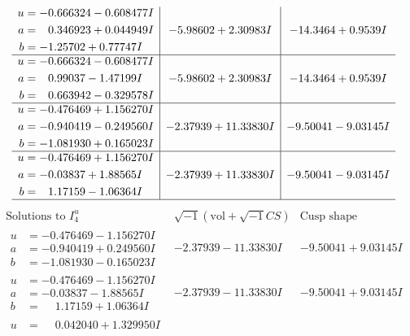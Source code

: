 \documentclass[1p]{elsarticle_modified}
\theoremstyle{definition}
\newcommand{\I}{\sqrt{-1}}
\begin{document}
$$\begin{array}{c|c|c}
\begin{aligned}
u &= -0.666324 - 0.608477 I \\
a &= \phantom{-}0.346923 + 0.044949 I \\
b &= -1.25702 + 0.77747 I\end{aligned}
 & -5.98602 + 2.30983 I & -14.3464 + 0.9539 I \\ \hline\begin{aligned}
u &= -0.666324 - 0.608477 I \\
a &= \phantom{-}0.99037 - 1.47199 I \\
b &= \phantom{-}0.663942 - 0.329578 I\end{aligned}
 & -5.98602 + 2.30983 I & -14.3464 + 0.9539 I \\ \hline\begin{aligned}
u &= -0.476469 + 1.156270 I \\
a &= -0.940419 - 0.249560 I \\
b &= -1.081930 + 0.165023 I\end{aligned}
 & -2.37939 + 11.33830 I & -9.50041 - 9.03145 I \\ \hline\begin{aligned}
u &= -0.476469 + 1.156270 I \\
a &= -0.03837 + 1.88565 I \\
b &= \phantom{-}1.17159 - 1.06364 I\end{aligned}
 & -2.37939 + 11.33830 I & -9.50041 - 9.03145 I\\
 \hline 
 \end{array}$$\newpage$$\begin{array}{c|c|c}  
\text{Solutions to }I^u_{4}& \I (\text{vol} + \sqrt{-1}CS) & \text{Cusp shape}\\
 \hline 
\begin{aligned}
u &= -0.476469 - 1.156270 I \\
a &= -0.940419 + 0.249560 I \\
b &= -1.081930 - 0.165023 I\end{aligned}
 & -2.37939 - 11.33830 I & -9.50041 + 9.03145 I \\ \hline\begin{aligned}
u &= -0.476469 - 1.156270 I \\
a &= -0.03837 - 1.88565 I \\
b &= \phantom{-}1.17159 + 1.06364 I\end{aligned}
 & -2.37939 - 11.33830 I & -9.50041 + 9.03145 I \\ \hline\begin{aligned}
u &= \phantom{-}0.042040 + 1.329950 I \\

\end{aligned}
\end{array}$$
\end{document}

